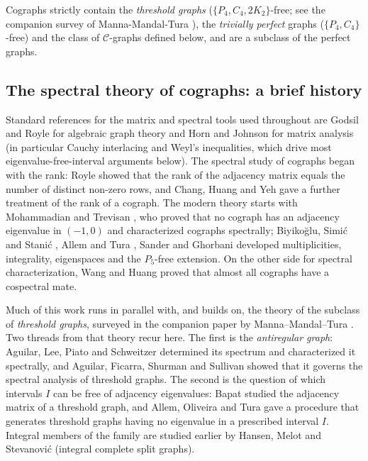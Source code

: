 \documentclass[11pt]{article}
\theoremstyle{plain}
\theoremstyle{definition}
\theoremstyle{remark}
\begin{document}
	Cographs strictly contain the \emph{threshold graphs} ($\{P_4,C_4,2K_2\}$-free; see the companion survey of Manna-Mandal-Tura \cite{MannaMandal2026}), the \emph{trivially perfect} graphs ($\{P_4,C_4\}$-free) and the class of $\mathcal{C}$-graphs defined below, and are a subclass of the perfect graphs.
	
	\subsection{The spectral theory of cographs: a brief history}
	
	Standard references for the matrix and spectral tools used throughout are Godsil and Royle \cite{GodsilRoyle2001} for algebraic graph theory and Horn and Johnson \cite{HornJohnson} for matrix analysis (in particular Cauchy interlacing and Weyl's inequalities, which drive most eigenvalue-free-interval arguments below). The spectral study of cographs began with the rank: Royle \cite{Royle2003} showed that the rank of the adjacency matrix equals the number of distinct non-zero rows, and Chang, Huang and Yeh \cite{ChangHuangYeh2008} gave a further treatment of the rank of a cograph. The modern theory starts with Mohammadian and Trevisan \cite{MohammadianTrevisan2016}, who proved that no cograph has an adjacency eigenvalue in $(-1,0)$ and characterized cographs spectrally; Biyiko\u{g}lu, Simi\'c and Stani\'c \cite{BiyikogluSimicStanic2011}, Allem and Tura \cite{AllemTura2018,AllemTura2020}, Sander \cite{Sander2008} and Ghorbani \cite{Ghorbani2019p5,GhorbaniDilworthNumber2019,Ghorbani2019threshold} developed multiplicities, integrality, eigenspaces and the $P_5$-free extension. On the other side for spectral characterization, Wang and Huang \cite{WangHuang2025} proved that almost all cographs have a cospectral mate.
	
	Much of this work runs in parallel with, and builds on, the theory of the subclass of \emph{threshold graphs}, surveyed in the companion paper  by Manna--Mandal--Tura \cite{MannaMandal2026}. Two threads from that theory recur here. The first is the \emph{antiregular graph}: Aguilar, Lee, Piato and Schweitzer \cite{AguilarLeePiatoSchweitzer2018} determined its spectrum and characterized it spectrally, and Aguilar, Ficarra, Shurman and Sullivan \cite{AguilarFicarraShurmanSullivan2020} showed that it governs the spectral analysis of threshold graphs. The second is the question of which intervals $I$ can be free of adjacency eigenvalues: Bapat \cite{Bapat2013} studied the adjacency matrix of a threshold graph, and Allem, Oliveira and Tura \cite{AllemOliveiraTura2023} gave a procedure that generates threshold graphs having no eigenvalue in a prescribed interval $I$. Integral members of the family are studied earlier by Hansen, Melot and Stevanovi\'c \cite{HansenMelotStevanovic2002} (integral complete split graphs).
	
\end{document}
